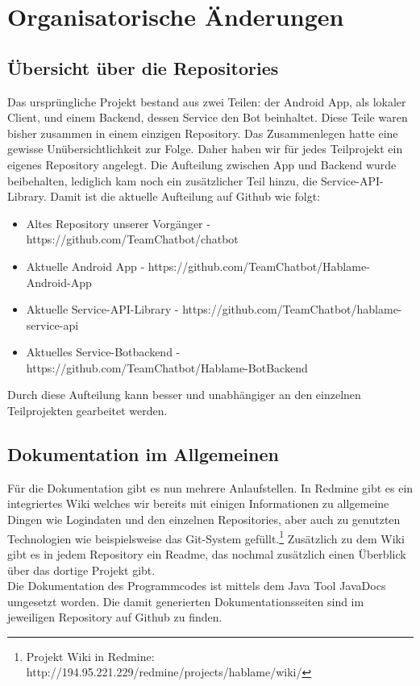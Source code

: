 \section{Organisatorische Änderungen}

\subsection{Übersicht über die Repositories}
Das ursprüngliche Projekt bestand aus zwei Teilen: der Android App, als lokaler Client, und einem Backend, dessen Service den Bot beinhaltet. Diese Teile waren bisher zusammen in einem einzigen Repository. Das Zusammenlegen hatte eine gewisse Unübersichtlichkeit zur Folge. Daher haben wir für jedes Teilprojekt ein eigenes Repository angelegt. Die Aufteilung zwischen App und Backend wurde beibehalten, lediglich kam noch ein zusätzlicher Teil hinzu, die Service-API-Library. Damit ist die aktuelle Aufteilung auf Github wie folgt:
\begin{itemize}\itemsep0pt
	\item Altes Repository unserer Vorgänger - https://github.com/TeamChatbot/chatbot
	\item Aktuelle Android App - https://github.com/TeamChatbot/Hablame-Android-App
	\item Aktuelle Service-API-Library - https://github.com/TeamChatbot/hablame-service-api
	\item Aktuelles Service-Botbackend - \\https://github.com/TeamChatbot/Hablame-BotBackend
\end{itemize}
Durch diese Aufteilung kann besser und unabhängiger an den einzelnen Teilprojekten gearbeitet werden.

\subsection{Dokumentation im Allgemeinen}
Für die Dokumentation gibt es nun mehrere Anlaufstellen. In Redmine gibt es ein integriertes Wiki welches wir bereits mit einigen Informationen zu allgemeine Dingen wie Logindaten und den einzelnen Repositories, aber auch zu genutzten Technologien wie beispielsweise das Git-System gefüllt.\footnote{Projekt Wiki in Redmine: http://194.95.221.229/redmine/projects/hablame/wiki/}
Zusätzlich zu dem Wiki gibt es in jedem Repository ein Readme, das nochmal zusätzlich einen Überblick über das dortige Projekt gibt.\\
Die Dokumentation des Programmcodes ist mittels dem Java Tool JavaDocs umgesetzt worden. Die damit generierten Dokumentationsseiten sind im jeweiligen Repository auf Github zu finden.

